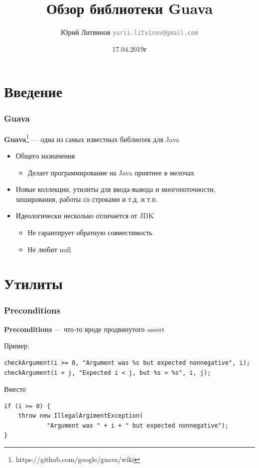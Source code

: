 \documentclass[xetex,mathserif,serif]{beamer}
\title{Обзор библиотеки Guava}
\author[Юрий Литвинов]{Юрий Литвинов \newline \textcolor{gray}{\small\texttt{yurii.litvinov@gmail.com}}}
\date{17.04.2019г}
\begin{document}
	
	\frame{\titlepage}
	
	\section{Введение}

	\begin{frame}
		\frametitle{Guava}
		\textbf{Guava}\footnote{https://github.com/google/guava/wiki} --- одна из самых известных библиотек для Java
		\begin{itemize}
			\item Общего назначения
			\begin{itemize}
				\item Делает программирование на Java приятнее в мелочах
			\end{itemize}
			\item Новые коллекции, утилиты для ввода-вывода и многопоточности, хеширования, работы со строками и т.д. и т.п.
			\item Идеологически несколько отличается от JDK
			\begin{itemize}
				\item Не гарантирует обратную совместимость
				\item Не любит null
			\end{itemize}
		\end{itemize}
	\end{frame}

	\section{Утилиты}

	\begin{frame}[fragile]
		\frametitle{Preconditions}
		\textbf{Preconditions} --- что-то вроде продвинутого assert
		
		Пример:
		\begin{verbatim}
checkArgument(i >= 0, "Argument was %s but expected nonnegative", i);
checkArgument(i < j, "Expected i < j, but %s > %s", i, j);
		\end{verbatim}
		Вместо
		\begin{verbatim}
if (i >= 0) { 
    throw new IllegalArgimentException(
            "Argument was " + i + " but expected nonnegative");
}
		\end{verbatim}
\end{frame}
\end{document}
